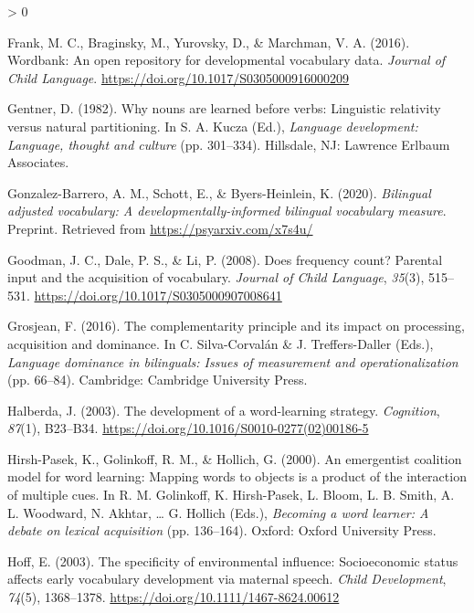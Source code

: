 \documentclass[
  english,
  ,man,floatsintext]{apa6}
\newlength{\cslhangindent}
\newenvironment{CSLReferences}[2] %
 {%
  \setlength{\parindent}{0pt}
  \ifodd #1 \everypar{\setlength{\hangindent}{\cslhangindent}}\ignorespaces\fi
  \ifnum #2 > 0
  \setlength{\parskip}{#2\baselineskip}
  \fi
 }%
 {}
\begin{document}
\begin{CSLReferences}{1}{0}
\leavevmode\hypertarget{ref-Frank_etal_2016}{}%
Frank, M. C., Braginsky, M., Yurovsky, D., \& Marchman, V. A. (2016). Wordbank: An open repository for developmental vocabulary data. \emph{Journal of Child Language}. \url{https://doi.org/10.1017/S0305000916000209}

\leavevmode\hypertarget{ref-Gentner_1982}{}%
Gentner, D. (1982). Why nouns are learned before verbs: Linguistic relativity versus natural partitioning. In S. A. Kucza (Ed.), \emph{Language development: Language, thought and culture} (pp. 301--334). Hillsdale, NJ: Lawrence Erlbaum Associates.

\leavevmode\hypertarget{ref-Gonzalez-Barrero_2020}{}%
Gonzalez-Barrero, A. M., Schott, E., \& Byers-Heinlein, K. (2020). \emph{Bilingual adjusted vocabulary: A developmentally-informed bilingual vocabulary measure}. Preprint. Retrieved from \url{https://psyarxiv.com/x7s4u/}

\leavevmode\hypertarget{ref-Goodman_etal_2008}{}%
Goodman, J. C., Dale, P. S., \& Li, P. (2008). Does frequency count? Parental input and the acquisition of vocabulary. \emph{Journal of Child Language}, \emph{35}(3), 515--531. \url{https://doi.org/10.1017/S0305000907008641}

\leavevmode\hypertarget{ref-Grosjean_2016}{}%
Grosjean, F. (2016). The complementarity principle and its impact on processing, acquisition and dominance. In C. Silva-Corvalán \& J. Treffers-Daller (Eds.), \emph{Language dominance in bilinguals: Issues of measurement and operationalization} (pp. 66--84). Cambridge: Cambridge University Press.

\leavevmode\hypertarget{ref-Halberda_2003}{}%
Halberda, J. (2003). The development of a word-learning strategy. \emph{Cognition}, \emph{87}(1), B23--B34. \url{https://doi.org/10.1016/S0010-0277(02)00186-5}

\leavevmode\hypertarget{ref-Hirsh-Pasek_etal_2000}{}%
Hirsh-Pasek, K., Golinkoff, R. M., \& Hollich, G. (2000). An emergentist coalition model for word learning: Mapping words to objects is a product of the interaction of multiple cues. In R. M. Golinkoff, K. Hirsh-Pasek, L. Bloom, L. B. Smith, A. L. Woodward, N. Akhtar, \ldots{} G. Hollich (Eds.), \emph{Becoming a word learner: A debate on lexical acquisition} (pp. 136--164). Oxford: Oxford University Press.

\leavevmode\hypertarget{ref-Hoff_2003}{}%
Hoff, E. (2003). The specificity of environmental influence: Socioeconomic status affects early vocabulary development via maternal speech. \emph{Child Development}, \emph{74}(5), 1368--1378. \url{https://doi.org/10.1111/1467-8624.00612}


\end{CSLReferences}
\end{document}
